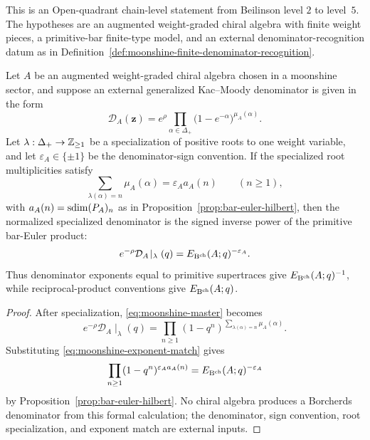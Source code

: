 \begin{theorem}
\label{thm:moonshine-bar-euler-master}
This is an Open-quadrant chain-level statement from Beilinson level
$2$ to level~$5$. The hypotheses are an augmented weight-graded
chiral algebra with finite weight pieces, a primitive-bar finite-type
model, and an external denominator-recognition datum as in
Definition~\ref{def:moonshine-finite-denominator-recognition}.

Let $A$ be an augmented weight-graded chiral algebra chosen in a
moonshine sector, and suppose an external generalized Kac--Moody
denominator is given in the form
\begin{equation}
\label{eq:moonshine-master}
 \mathcal D_A(\mathbf z)
 =
 e^\rho
 \prod_{\alpha\in\Delta_+}
 \bigl(1-e^{-\alpha}\bigr)^{\mu_A(\alpha)} .
\end{equation}
Let $\lambda:\Delta_+\to\mathbb Z_{\geq 1}$ be a specialization of positive
roots to one weight variable, and let
$\varepsilon_A\in\{\pm1\}$ be the denominator-sign convention.  If the
specialized root multiplicities satisfy
\begin{equation}
\label{eq:moonshine-exponent-match}
 \sum_{\lambda(\alpha)=n}\mu_A(\alpha)
 =
 \varepsilon_A a_A(n)
 \qquad(n\geq 1),
\end{equation}
with $a_A(n)=\operatorname{sdim}(P_A)_n$ as in
Proposition~\ref{prop:bar-euler-hilbert}, then the normalized
specialized denominator is the signed inverse power of the primitive
bar-Euler product:
\[
 e^{-\rho}\mathcal D_A\!\mid_\lambda(q)
 =
 E_{\mathrm B^{\mathrm{ch}}}(A;q)^{-\varepsilon_A}.
\]
Thus denominator exponents equal to primitive supertraces give
$E_{\mathrm B^{\mathrm{ch}}}(A;q)^{-1}$, while reciprocal-product conventions give
$E_{\mathrm B^{\mathrm{ch}}}(A;q)$.
\end{theorem}

\begin{proof}
After specialization, \eqref{eq:moonshine-master} becomes
\[
 e^{-\rho}\mathcal D_A\!\mid_\lambda(q)
 =
 \prod_{n\geq 1}
 (1-q^n)^{\sum_{\lambda(\alpha)=n}\mu_A(\alpha)} .
\]
Substituting \eqref{eq:moonshine-exponent-match} gives
\[
 \prod_{n\geq 1}(1-q^n)^{\varepsilon_A a_A(n)}
 =
 E_{\mathrm B^{\mathrm{ch}}}(A;q)^{-\varepsilon_A}
\]
by Proposition~\ref{prop:bar-euler-hilbert}.  No chiral algebra
produces a Borcherds denominator from this formal calculation; the
denominator, sign convention, root specialization, and exponent match
are external inputs.
\end{proof}

